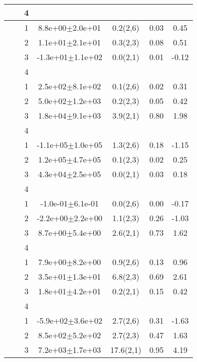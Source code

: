 \begin{longtable}{llccccS[table-format=-2.2, table-space-text-post = {***}]}
   &  & 4 &  &  &  &  \\ 
   \midrule
{} & {} & 1 &  8.8e+00$\pm$2.0e+01 & 0.2(2,6) & 0.03 & 0.45 \\ 
   &  & 2 &  1.1e+01$\pm$2.1e+01 & 0.3(2,3) & 0.08 & 0.51 \\ 
   &  & 3 & -1.3e+01$\pm$1.1e+02 & 0.0(2,1) & 0.01 & -0.12 \\ 
   &  & 4 &  &  &  &  \\ 
   \midrule
{} & {} & 1 &  2.5e+02$\pm$8.1e+02 & 0.1(2,6) & 0.02 & 0.31 \\ 
   &  & 2 &  5.0e+02$\pm$1.2e+03 & 0.2(2,3) & 0.05 & 0.42 \\ 
   &  & 3 &  1.8e+04$\pm$9.1e+03 & 3.9(2,1) & 0.80 & 1.98 \\ 
   &  & 4 &  &  &  &  \\ 
   \midrule
{} & {} & 1 & -1.1e+05$\pm$1.0e+05 & 1.3(2,6) & 0.18 & -1.15 \\ 
   &  & 2 &  1.2e+05$\pm$4.7e+05 & 0.1(2,3) & 0.02 & 0.25 \\ 
   &  & 3 &  4.3e+04$\pm$2.5e+05 & 0.0(2,1) & 0.03 & 0.18 \\ 
   &  & 4 &  &  &  &  \\ 
   \midrule
{} & {} & 1 & -1.0e-01$\pm$6.1e-01 & 0.0(2,6) & 0.00 & -0.17 \\ 
   &  & 2 & -2.2e+00$\pm$2.2e+00 & 1.1(2,3) & 0.26 & -1.03 \\ 
   &  & 3 &  8.7e+00$\pm$5.4e+00 & 2.6(2,1) & 0.73 & 1.62 \\ 
   &  & 4 &  &  &  &  \\ 
   \midrule
{} & {} & 1 &  7.9e+00$\pm$8.2e+00 & 0.9(2,6) & 0.13 & 0.96 \\ 
   &  & 2 &  3.5e+01$\pm$1.3e+01 & 6.8(2,3) & 0.69 & 2.61 \\ 
   &  & 3 &  1.8e+01$\pm$4.2e+01 & 0.2(2,1) & 0.15 & 0.42 \\ 
   &  & 4 &  &  &  &  \\ 
   \midrule
{} & {} & 1 & -5.9e+02$\pm$3.6e+02 & 2.7(2,6) & 0.31 & -1.63 \\ 
   &  & 2 &  8.5e+02$\pm$5.2e+02 & 2.7(2,3) & 0.47 & 1.63 \\ 
   &  & 3 &  7.2e+03$\pm$1.7e+03 & 17.6(2,1) & 0.95 & 4.19 \\ 

\end{longtable}

